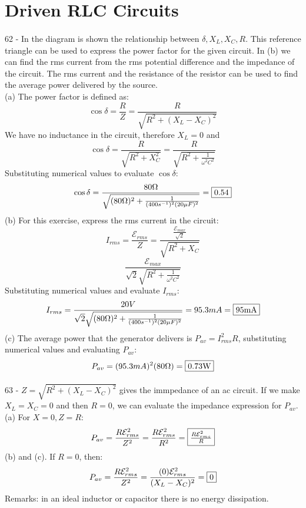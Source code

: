 \documentclass{report}
\begin{document}
\section{Driven RLC Circuits}

\paragraph{}
62 - In the diagram is shown the relationship between $\delta, X_L, X_C, R$. This reference triangle can be used to express the power factor for the given circuit. In (b) we can find the rms current from the rms potential difference and the impedance of the circuit. The rms current and the resistance of the resistor can be used to find the average power delivered by the source.\\
(a) The power factor is defined as:
$$\cos \delta = \frac{R}{Z} = \frac{R}{\sqrt{R^2 + (X_L - X_C)^2}}$$
We have no inductance in the circuit, therefore $X_L = 0$ and
$$\cos \delta = \frac{R}{\sqrt{R^2 + X_C^2}} = \frac{R}{\sqrt{R^2 + \frac{1}{\omega^2 C^2}}}$$
Substituting numerical values to evaluate $\cos \delta$:
$$\cos \delta = \frac{80\Omega}{\sqrt{(80\Omega)^2 + \frac{1}{(400s^{-1})^2(20 \mu F)^2}}} = \fbox{0.54}$$
(b) For this exercise, express the rms current in the circuit:
$$I_{rms} = \frac{\mathcal{E}_{rms}}{Z} = \frac{\frac{\mathcal{E}_{max}}{\sqrt{2}}}{\sqrt{R^2 + X_C}}$$
$$\frac{\mathcal{E}_{max}}{\sqrt{2} \sqrt{R^2 + \frac{1}{\omega^2 C^2}}}$$
Substituting numerical values and evaluate $I_{rms}$:
$$I_{rms} = \frac{20V}{\sqrt{2}\sqrt{(80\Omega)^2 + \frac{1}{(400s^{-1})^2(20 \mu F)^2}}} = 95.3mA = \fbox{95mA}$$
(c) The average power that the generator delivers is $P_{av} = I_{rms}^2R$, substituting numerical values and evaluating $P_{av}$:
$$P_{av} = (95.3mA)^2(80\Omega) = \fbox{0.73W}$$

\paragraph{}
63 - $Z = \sqrt{R^2 + (X_L - X_C)^2}$ gives the immpedance of an ac circuit. If we make $X_L = X_C = 0$ and then $R = 0$, we can evaluate the impedance expression for $P_{av}$.\\
(a) For $X = 0, Z = R$:
$$P_{av} = \frac{R\mathcal{E}_{rms}^2}{Z^2} = \frac{R\mathcal{E}_{rms}^2}{R^2} = \fbox{$\frac{R\mathcal{E}_{rms}^2}{R}$}$$
(b) and (c). If $R = 0$, then:
$$P_{av} = \frac{R\mathcal{E}_{rms}^2}{Z^2} = \frac{(0)\mathcal{E}_{rms}^2}{(X_L - X_C)^2} = \fbox{0}$$
Remarks: in an ideal inductor or capacitor there is no energy dissipation.
\end{document}
